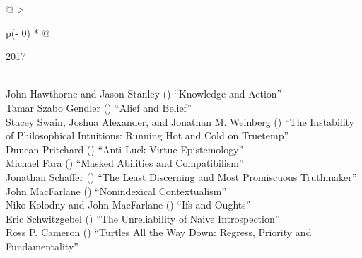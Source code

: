 \documentclass[
  10pt,
  letterpaper,
  DIV=11,
  numbers=noendperiod,
  twoside]{scrartcl}
\begin{document}
\begin{longtable}[]{@{}
  >{\raggedright\arraybackslash}p{(\columnwidth - 0\tabcolsep) * }@{}}

\caption{\label{tbl-top-ten-2008}Most cited articles published less than
ten years ago as of 2017.}

\tabularnewline

\toprule\noalign{}
\begin{minipage}[b]{\linewidth}\raggedright
2017
\end{minipage} \\
\midrule\noalign{}
\endhead
\bottomrule\noalign{}
\endlastfoot
John Hawthorne and Jason Stanley
()
``Knowledge and Action'' \\
Tamar Szabo Gendler
()
``Alief and Belief'' \\
Stacey Swain, Joshua Alexander, and Jonathan M. Weinberg
()
``The Instability of Philosophical Intuitions: Running Hot and Cold on
Truetemp'' \\
Duncan Pritchard
()
``Anti-Luck Virtue Epistemology'' \\
Michael Fara
()
``Masked Abilities and Compatibilism'' \\
Jonathan Schaffer
()
``The Least Discerning and Most Promiscuous Truthmaker'' \\
John MacFarlane
()
``Nonindexical Contextualism'' \\
Niko Kolodny and John MacFarlane
()
``Ifs and Oughts'' \\
Eric Schwitzgebel
()
``The Unreliability of Naive Introspection'' \\
Ross P. Cameron
()
``Turtles All the Way Down: Regress, Priority and Fundamentality'' \\

\end{longtable}
\end{document}
